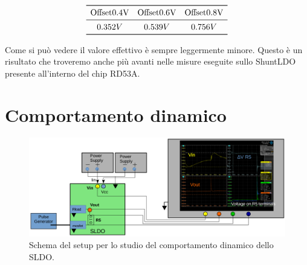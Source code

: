 \[
\begin{array}{ccc}

\toprule
\mathrm{Offset 0.4 V} & \mathrm{Offset 0.6 V} & \mathrm{Offset 0.8 V} \\

\midrule

0.352 V & 0.539 V & 0.756 V \\

\bottomrule
\end{array}
\]

Come si può vedere il valore effettivo è sempre leggermente minore. Questo è un risultato che troveremo anche più avanti nelle misure eseguite sullo ShuntLDO presente all'interno del chip RD53A. 


\section{Comportamento dinamico}

\begin{figure}
\centering
\includegraphics[scale=.3]{Immagini/SetupScheme}
\caption{Schema del setup per lo studio del comportamento dinamico dello SLDO.}
\label{Setupscheme}
\end{figure}

